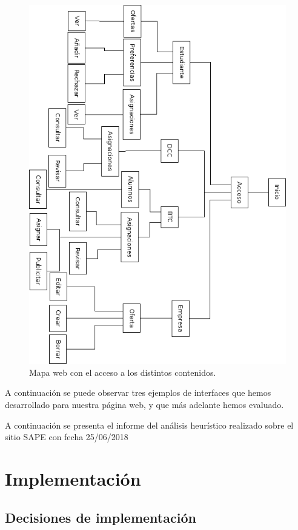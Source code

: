 \documentclass[pdftex,11pt,a4paper]{book}
\begin{document}
\begin{figure}[h]
\begin{center}
\includegraphics[width=\textwidth]{img/arbol_web}
\caption{\label{mapa_web} Mapa web con el acceso a los distintos contenidos.}
\end{center}
\end{figure}


A continuación se puede observar tres ejemplos de interfaces que hemos desarrollado para nuestra página web, y que más adelante hemos evaluado.


A continuación se presenta el informe del análisis heurístico realizado sobre el sitio SAPE con fecha 25/06/2018


\chapter{Implementación}
\section{Decisiones de implementación}
\end{document}
